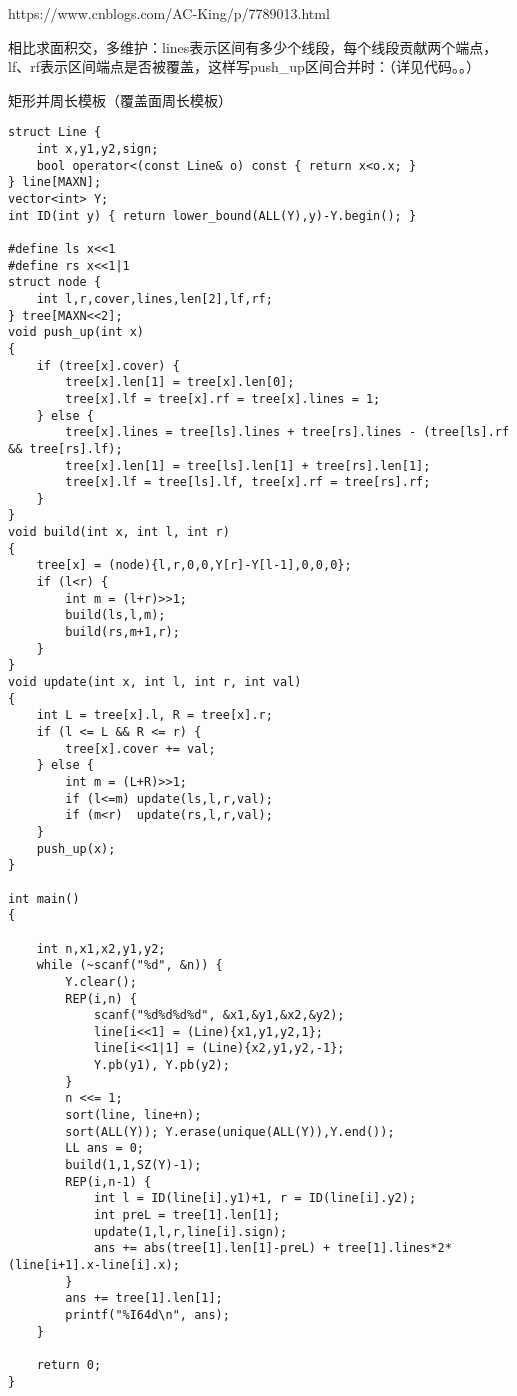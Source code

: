 https://www.cnblogs.com/AC-King/p/7789013.html

相比求面积交，多维护：lines表示区间有多少个线段，每个线段贡献两个端点，lf、rf表示区间端点是否被覆盖，这样写push\_up区间合并时：（详见代码。。）

矩形并周长模板（覆盖面周长模板）

\begin{lstlisting}
struct Line {
    int x,y1,y2,sign;
    bool operator<(const Line& o) const { return x<o.x; }
} line[MAXN];
vector<int> Y;
int ID(int y) { return lower_bound(ALL(Y),y)-Y.begin(); }

#define ls x<<1
#define rs x<<1|1
struct node {
    int l,r,cover,lines,len[2],lf,rf;
} tree[MAXN<<2];
void push_up(int x)
{
    if (tree[x].cover) {
        tree[x].len[1] = tree[x].len[0];
        tree[x].lf = tree[x].rf = tree[x].lines = 1;
    } else {
        tree[x].lines = tree[ls].lines + tree[rs].lines - (tree[ls].rf && tree[rs].lf);
        tree[x].len[1] = tree[ls].len[1] + tree[rs].len[1];
        tree[x].lf = tree[ls].lf, tree[x].rf = tree[rs].rf;
    }
}
void build(int x, int l, int r)
{
    tree[x] = (node){l,r,0,0,Y[r]-Y[l-1],0,0,0};
    if (l<r) {
        int m = (l+r)>>1;
        build(ls,l,m);
        build(rs,m+1,r);
    }
}
void update(int x, int l, int r, int val)
{
    int L = tree[x].l, R = tree[x].r;
    if (l <= L && R <= r) {
        tree[x].cover += val;
    } else {
        int m = (L+R)>>1;
        if (l<=m) update(ls,l,r,val);
        if (m<r)  update(rs,l,r,val);
    }
    push_up(x);
}

int main()
{

    int n,x1,x2,y1,y2;
    while (~scanf("%d", &n)) {
        Y.clear();
        REP(i,n) {
            scanf("%d%d%d%d", &x1,&y1,&x2,&y2);
            line[i<<1] = (Line){x1,y1,y2,1};
            line[i<<1|1] = (Line){x2,y1,y2,-1};
            Y.pb(y1), Y.pb(y2);
        }
        n <<= 1;
        sort(line, line+n);
        sort(ALL(Y)); Y.erase(unique(ALL(Y)),Y.end());
        LL ans = 0;
        build(1,1,SZ(Y)-1);
        REP(i,n-1) {
            int l = ID(line[i].y1)+1, r = ID(line[i].y2);
            int preL = tree[1].len[1];
            update(1,l,r,line[i].sign);
            ans += abs(tree[1].len[1]-preL) + tree[1].lines*2*(line[i+1].x-line[i].x);
        }
        ans += tree[1].len[1];
        printf("%I64d\n", ans);
    }

    return 0;
}
\end{lstlisting}